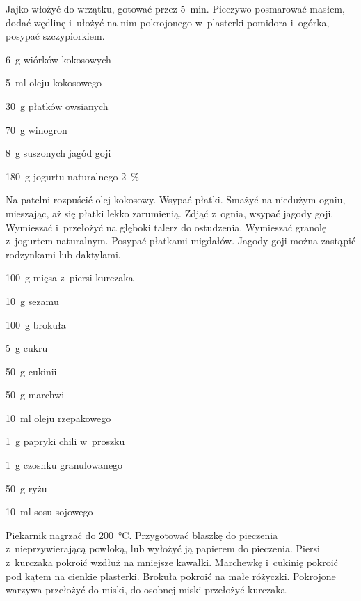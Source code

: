 \documentclass[../kucharek.tex]{subfiles}
\begin{document}
Jajko włożyć do wrzątku, gotować przez \qty{5}{\minute}. Pieczywo posmarować
masłem, dodać wędlinę i~ułożyć na nim pokrojonego w~plasterki pomidora
i~ogórka, posypać szczypiorkiem.


\begin{Ingred}
    \item \qty{6}{\gram} wiórków kokosowych
    \item \qty{5}{\milli\litre} oleju kokosowego
    \item \qty{30}{\gram} płatków owsianych
    \item \qty{70}{\gram} winogron
    \item \qty{8}{\gram} suszonych jagód goji
    \item \qty{180}{\gram} jogurtu naturalnego \qty{2}{\percent}
\end{Ingred}

Na patelni rozpuścić olej kokosowy. Wsypać płatki. Smażyć na niedużym ogniu,
mieszając, aż się płatki lekko zarumienią. Zdjąć z~ognia, wsypać jagody goji.
Wymieszać i~przełożyć na głęboki talerz do ostudzenia. Wymieszać granolę
z~jogurtem naturalnym. Posypać płatkami migdałów. Jagody goji można zastąpić
rodzynkami lub daktylami.


\begin{Ingred}
    \item \qty{100}{\gram} mięsa z~piersi kurczaka
    \item \qty{10}{\gram} sezamu
    \item \qty{100}{\gram} brokuła
    \item \qty{5}{\gram} cukru
    \item \qty{50}{\gram} cukinii
    \item \qty{50}{\gram} marchwi
    \item \qty{10}{\milli\litre} oleju rzepakowego
    \item \qty{1}{\gram} papryki chili w~proszku
    \item \qty{1}{\gram} czosnku granulowanego
    \item \qty{50}{\gram} ryżu
    \item \qty{10}{\milli\litre} sosu sojowego
\end{Ingred}

Piekarnik nagrzać do \qty{200}{\celsius}. Przygotować blaszkę do pieczenia
z~nieprzywierającą powłoką, lub wyłożyć ją papierem do pieczenia. Piersi
z~kurczaka pokroić wzdłuż na mniejsze kawałki. Marchewkę i~cukinię pokroić pod
kątem na cienkie plasterki. Brokuła pokroić na małe różyczki. Pokrojone warzywa
przełożyć do miski, do osobnej miski przełożyć kurczaka.
\end{document}
